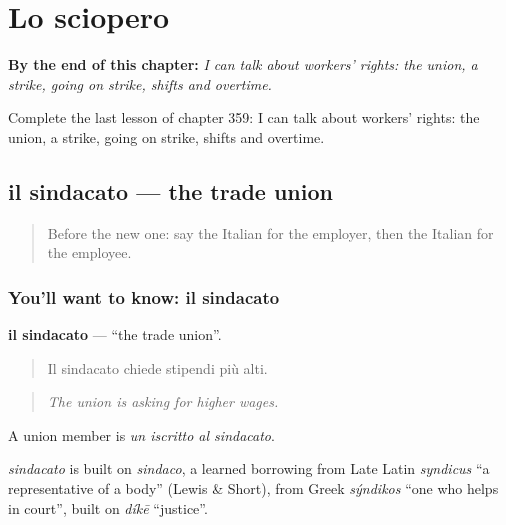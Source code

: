 
\chapter{Lo sciopero}
\label{ch:it-lo-sciopero}

\begin{chapteropening}
\textbf{By the end of this chapter:} \emph{I can talk about workers' rights: the union, a strike, going on strike, shifts and overtime.}

Complete the last lesson of chapter 359: I can talk about workers' rights: the union, a strike, going on strike, shifts and overtime.
\end{chapteropening}

\section[il sindacato]{il sindacato — the trade union}

\label{lesson:IT-C359-sindacato}



\begin{quote}
Before the new one: say the Italian for the employer, then the Italian for the employee.
\end{quote}

\subsection*{You'll want to know: il sindacato}
\textbf{il sindacato} — \textquotedblleft{}the trade union\textquotedblright{}.

\begin{quote}
Il sindacato chiede stipendi più alti.
\end{quote}

\begin{quote}
\emph{The union is asking for higher wages.}
\end{quote}

A union member is \emph{un iscritto al sindacato}.

\begin{cousinweb}
\emph{sindacato} is built on \emph{sindaco}, a learned borrowing from Late Latin \emph{syndicus} \textquotedblleft{}a representative of a body\textquotedblright{} (Lewis \& Short), from Greek \emph{sýndikos} \textquotedblleft{}one who helps in court\textquotedblright{}, built on \emph{díkē} \textquotedblleft{}justice\textquotedblright{}.
\end{cousinweb}

